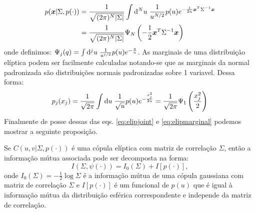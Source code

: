 \begin{align}
 p(\vec{x} | \Sigma , p(\cdot)) &= \frac{1}{\sqrt{(2\pi)^N |\Sigma|}} \int \ud^N u\;\frac{1}{u^{N/2}} p(u) e^{-\frac{1}{2u} \vec{x}^{T} \Sigma^{-1} \vec{x}}  \\
		     &= \frac{1}{\sqrt{(2\pi)^N |\Sigma|}} \Psi_{N}\left(-\frac{1}{2} \vec{x}^{T}\Sigma^{-1}\vec{x}\right) \label{eq:elipjoint}
\end{align}
onde definimos: $\Psi_j(q) = \int \mathrm{d}^j u \; \frac{1}{u^{j/2}} p(u) e^{-\frac{q}{u}}$. As marginais de uma distribuição elíptica podem ser facilmente calculadas notando-se que as marginais da normal padronizada são distribuições normais padronizadas sobre 1 variavel. Dessa forma:
\begin{equation}
\label{eq:elipmarginal}
 p_j(x_j) = \frac{1}{\sqrt{2\pi}}\int \ud u \;\frac{1}{\sqrt{u}} p(u) e^{-\frac{x_j^2}{2u}} = \frac{1}{\sqrt{2\pi}} \Psi_{1}\left(\frac{x_j^2}{2}\right)
\end{equation}
Finalmente de posse dessas das eqs. \eqref{eq:elipjoint} e \eqref{eq:elipmarginal} podemos mostrar a seguinte proposição.
\begin{Proposicao}
Se $C(u,v | \Sigma, p(\cdot))$ é uma cópula elíptica com matriz de correlação $\Sigma$, então a informação mútua associada pode ser decomposta na forma:
\begin{equation}
  I(\Sigma, \psi(\cdot)) = I_{0}(\Sigma) + I[p(\cdot)],
\end{equation}
onde $I_{0}(\Sigma) = -\frac{1}{2}\log\Sigma$ é a informação mútua de uma cópula gaussiana com matriz de correlação $\Sigma$ e $I[p(\cdot)]$ é um funcional de $p(u)$ que é igual à informação mútua da distribuição esférica correspondente e independe da matriz de correlação. 
\end{Proposicao}
